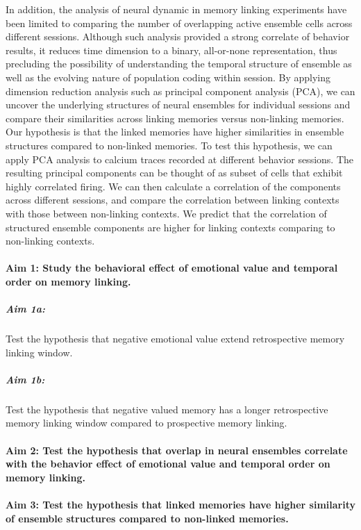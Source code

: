 \documentclass[master.tex]{subfiles}
\begin{document}
In addition, the analysis of neural dynamic in memory linking experiments have
been limited to comparing the number of overlapping active ensemble cells across
different sessions. Although such analysis provided a strong correlate of
behavior results, it reduces time dimension to a binary, all-or-none
representation, thus precluding the possibility of understanding the temporal
structure of ensemble as well as the evolving nature of population coding within
session. By applying dimension reduction analysis such as principal component
analysis (PCA), we can uncover the underlying structures of neural ensembles for
individual sessions and compare their similarities across linking memories
versus non-linking memories. Our hypothesis is that the linked memories have
higher similarities in ensemble structures compared to non-linked memories. To
test this hypothesis, we can apply PCA analysis to calcium traces recorded at
different behavior sessions. The resulting principal components can be thought
of as subset of cells that exhibit highly correlated firing. We can then
calculate a correlation of the components across different sessions, and compare
the correlation between linking contexts with those between non-linking
contexts. We predict that the correlation of structured ensemble components are
higher for linking contexts comparing to non-linking contexts.

\paragraph{Aim 1: Study the behavioral effect of emotional value and temporal
  order on memory linking.}

\subparagraph{Aim 1a:} Test the hypothesis that negative emotional value extend
retrospective memory linking window.

\subparagraph{Aim 1b:} Test the hypothesis that negative valued memory has a
longer retrospective memory linking window compared to prospective memory
linking.

\paragraph{Aim 2: Test the hypothesis that overlap in neural ensembles correlate
  with the behavior effect of emotional value and temporal order on memory
  linking.}

\paragraph{Aim 3: Test the hypothesis that linked memories have higher
  similarity of ensemble structures compared to non-linked memories.}

\newpage
\end{document}
